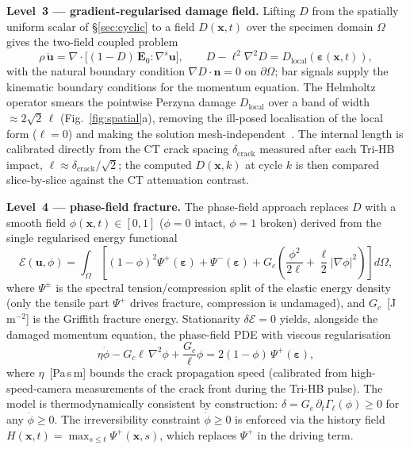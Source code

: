 \documentclass[sn-basic]{sn-jnl}
\begin{document}
\textbf{Level~3 --- gradient-regularised damage field.}
Lifting $D$ from the spatially uniform scalar of \S\ref{sec:cyclic} to a field
$D(\mathbf{x},t)$ over the specimen domain $\Omega$ gives the two-field coupled problem
\begin{equation}
\rho\,\ddot{\mathbf{u}}=\nabla\cdot\big[(1-D)\,\mathbf{E}_0:\nabla^s\mathbf{u}\big],
\qquad
D-\ell^2\nabla^2 D=D_{\mathrm{local}}\!\left(\boldsymbol\varepsilon(\mathbf{x},t)\right),
\label{eq:gradD}
\end{equation}
with the natural boundary condition $\nabla D\cdot\mathbf{n}=0$ on $\partial\Omega$;
bar signals supply the kinematic boundary conditions for the momentum equation.  The
Helmholtz operator smears the pointwise Perzyna damage $D_{\mathrm{local}}$ over a
band of width ${\approx}2\sqrt{2}\,\ell$ (Fig.~\ref{fig:spatial}a), removing the
ill-posed localisation of the local form ($\ell=0$) and making the solution
mesh-independent~\citep{pijaudier1987}.  The internal length is calibrated directly
from the CT crack spacing $\delta_{\mathrm{crack}}$ measured after each Tri-HB
impact, $\ell\approx\delta_{\mathrm{crack}}/\sqrt{2}$; the computed $D(\mathbf{x},k)$
at cycle $k$ is then compared slice-by-slice against the CT attenuation contrast.

\textbf{Level~4 --- phase-field fracture.}
The phase-field approach replaces $D$ with a smooth field $\phi(\mathbf{x},t)\in[0,1]$
($\phi=0$ intact, $\phi=1$ broken) derived from the single regularised energy
functional~\citep{bourdin2000}
\begin{equation}
\mathcal{E}(\mathbf{u},\phi)=\int_\Omega\!\left[(1-\phi)^2\Psi^+(\boldsymbol\varepsilon)
+\Psi^-(\boldsymbol\varepsilon)
+G_c\!\left(\frac{\phi^2}{2\ell}+\frac{\ell}{2}|\nabla\phi|^2\right)\right]d\Omega,
\label{eq:pf}
\end{equation}
where $\Psi^\pm$ is the spectral tension/compression split of the elastic energy
density (only the tensile part $\Psi^+$ drives fracture, compression is
undamaged), and $G_c$~[J\,m$^{-2}$] is the Griffith fracture energy.  Stationarity
$\delta\mathcal{E}=0$ yields, alongside the damaged momentum equation, the
phase-field PDE with viscous regularisation
\begin{equation}
\eta\dot\phi - G_c\ell\,\nabla^2\phi+\frac{G_c}{\ell}\phi
=2(1-\phi)\,\Psi^+(\boldsymbol\varepsilon),
\label{eq:pfpde}
\end{equation}
where $\eta$~[Pa\,s\,m] bounds the crack propagation speed (calibrated from
high-speed-camera measurements of the crack front during the Tri-HB pulse).  The
model is thermodynamically consistent by construction:
$\delta=G_c\,\partial_t\Gamma_\ell(\phi)\ge0$ for any $\dot\phi\ge0$.  The
irreversibility constraint $\dot\phi\ge0$ is enforced via the history field
$H(\mathbf{x},t)=\max_{s\le t}\Psi^+(\mathbf{x},s)$, which replaces $\Psi^+$ in
the driving term.
\end{document}
